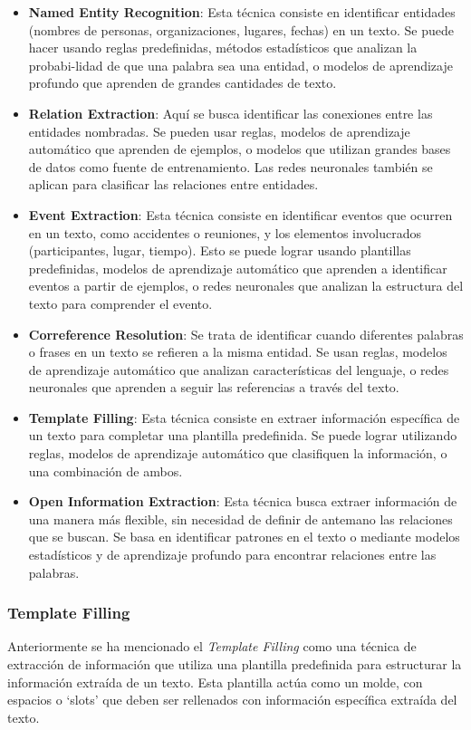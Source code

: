 \begin{itemize}
    \item \textbf{Named Entity Recognition}: Esta técnica consiste en identificar 
    entidades (nombres de personas, organizaciones, lugares, fechas) en un texto. 
    Se puede hacer usando reglas predefinidas, métodos estadísticos que analizan 
    la probabi-lidad de que una palabra sea una entidad, o modelos de aprendizaje 
    profundo que aprenden de grandes cantidades de texto.
    \item \textbf{Relation Extraction}: Aquí se busca identificar las conexiones 
    entre las entidades nombradas. Se pueden usar reglas, modelos de aprendizaje 
    automático que aprenden de ejemplos, o modelos que utilizan grandes bases de 
    datos como fuente de entrenamiento. Las redes neuronales también se aplican 
    para clasificar las relaciones entre entidades.
    \item \textbf{Event Extraction}: Esta técnica consiste en identificar eventos 
    que ocurren en un texto, como accidentes o reuniones, y los elementos 
    involucrados (participantes, lugar, tiempo). Esto se puede lograr usando plantillas 
    predefinidas, modelos de aprendizaje automático que aprenden a identificar eventos 
    a partir de ejemplos, o redes neuronales que analizan la estructura del texto para 
    comprender el evento.
    \item \textbf{Correference Resolution}: Se trata de identificar cuando diferentes 
    palabras o frases en un texto se refieren a la misma entidad. Se usan reglas, 
    modelos de aprendizaje automático que analizan características del lenguaje, 
    o redes neuronales que aprenden a seguir las referencias a través del texto.
    \item \textbf{Template Filling}: Esta técnica consiste en extraer información 
    específica de un texto para completar una plantilla predefinida. Se puede lograr 
    utilizando reglas, modelos de aprendizaje automático que clasifiquen la información, 
    o una combinación de ambos.
    \item \textbf{Open Information Extraction}: Esta técnica busca extraer información 
    de una manera más flexible, sin necesidad de definir de antemano las relaciones 
    que se buscan. Se basa en identificar patrones en el texto o mediante modelos 
    estadísticos y de aprendizaje profundo para encontrar relaciones entre las palabras.
\end{itemize}


\subsubsection{Template Filling}\label{section: templateFilling}
Anteriormente se ha mencionado el \textit{Template Filling} como una técnica de extracción 
de información que utiliza una plantilla predefinida para estructurar la información 
extraída de un texto. Esta plantilla actúa como un molde, con espacios o `slots' que 
deben ser rellenados con información específica extraída del texto.

